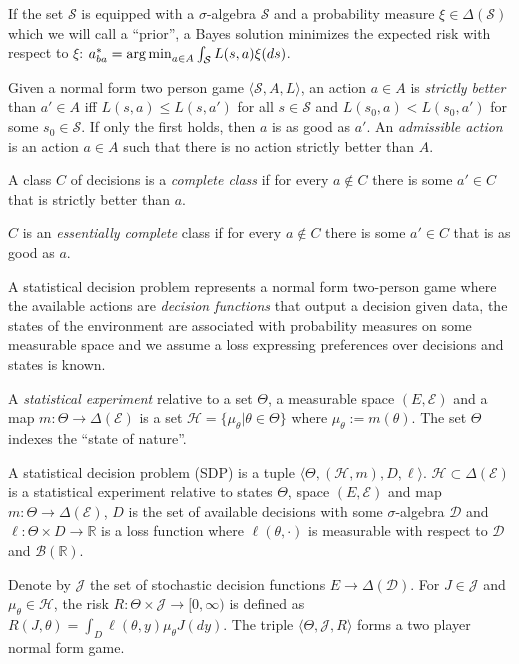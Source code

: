 If the set $\mathscr{S}$ is equipped with a $\sigma$-algebra $\mathcal{S}$ and a probability measure $\xi\in \Delta(\mathcal{S})$ which we will call a ``prior'', a Bayes solution minimizes the expected risk with respect to $\xi$: $a^*_{ba} = \operatorname*{arg\,min}_{a\in A} \int_{\mathcal{S}} L(s,a) \xi(ds)$.

\begin{definition}
Given a normal form two person game $\langle \mathscr{S}, A, L\rangle$, an action $a\in A$ is \emph{strictly better} than $a'\in A$ iff $L(s,a)\leq L(s,a')$ for all $s\in\mathscr{S}$ and $L(s_0,a)<L(s_0,a')$ for some $s_0\in \mathscr{S}$. If only the first holds, then $a$ is as good as $a'$. An \emph{admissible action} is an action $a\in A$ such that there is no action strictly better than $A$.
\end{definition}

\begin{definition}
A class $C$ of decisions is a \emph{complete class} if for every $a\not\in C$ there is some $a'\in C$ that is strictly better than $a$.

$C$ is an \emph{essentially complete} class if for every $a\not\in C$ there is some $a'\in C$ that is as good as $a$.
\end{definition}

A statistical decision problem represents a normal form two-person game where the available actions are \emph{decision functions} that output a decision given data, the states of the environment are associated with probability measures on some measurable space and we assume a loss expressing preferences over decisions and states is known.

\begin{definition}\label{def:stat_expt}
A \emph{statistical experiment} relative to a set $\Theta$, a measurable space $(E,\mathcal{E})$ and a map $m:\Theta\to \Delta(\mathcal{E})$ is a set $\mathscr{H}=\{\mu_\theta|\theta\in \Theta\}$ where $\mu_\theta:=m(\theta)$. The set $\Theta$ indexes the ``state of nature''.
\end{definition}


\begin{definition}
A statistical decision problem (SDP) is a tuple $\langle\Theta, (\mathscr{H},m), D, \ell\rangle$. $\mathscr{H}\subset\Delta(\mathcal{E})$ is a statistical experiment relative to states $\Theta$, space $(E,\mathcal{E})$ and map $m:\Theta\to \Delta(\mathcal{E})$, $D$ is the set of available decisions with some $\sigma$-algebra $\mathcal{D}$ and $\ell:\Theta\times D\to \mathbb{R}$ is a loss function where $\ell(\theta,\cdot)$ is measurable with respect to $\mathcal{D}$ and $\mathcal{B}(\mathbb{R})$.

Denote by $\mathscr{J}$ the set of stochastic decision functions $E\to \Delta(\mathcal{D})$. For $J\in \mathscr{J}$ and $\mu_\theta\in \mathcal{H}$, the risk $R:\Theta\times\mathscr{J}\to [0,\infty)$ is defined as $R(J,\theta) = \int_D \ell(\theta,y) \mu_\theta J(dy)$. The triple $\langle \Theta, \mathscr{J}, R\rangle$ forms a two player normal form game.
\end{definition}

